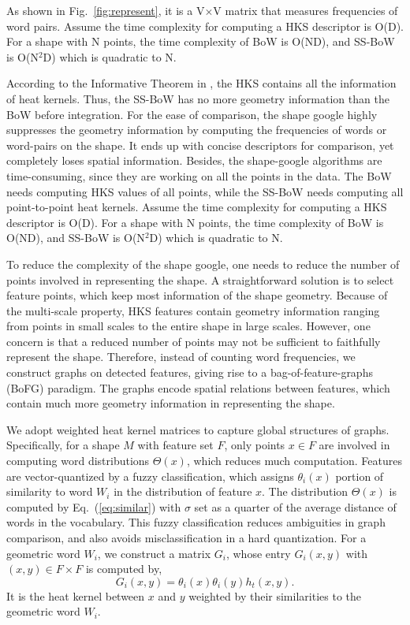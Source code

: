 As shown in Fig.~\ref{fig:represent}, it is a V$\times$V matrix that measures frequencies of word pairs. Assume the time complexity for computing a HKS descriptor is O(D). For a shape with N points, the time complexity of BoW is O(ND), and SS-BoW is O(N$^2$D) which is quadratic to N.

According to the Informative Theorem in \cite{Sun:2009:CGF}, the HKS contains all the information of heat kernels. Thus, the SS-BoW has no more geometry information than the BoW before integration. For the ease of comparison, the shape google highly suppresses the geometry information by computing the frequencies of words or word-pairs on the shape. It ends up with concise descriptors for comparison, yet completely loses spatial information. Besides, the shape-google algorithms are time-consuming, since they are working on all the points in the data. The BoW needs computing HKS values of all points, while the SS-BoW needs computing all point-to-point heat kernels. Assume the time complexity for computing a HKS descriptor is O(D). For a shape with N points, the time complexity of BoW is O(ND), and SS-BoW is O(N$^2$D) which is quadratic to N.

To reduce the complexity of the shape google, one needs to reduce the number of points involved in representing the shape. A straightforward solution is to select feature points, which keep most information of the shape geometry. Because of the multi-scale property, HKS features contain geometry information ranging from points in small scales to the entire shape in large scales. However, one concern is that a reduced number of points may not be sufficient to faithfully represent the shape. Therefore, instead of counting word frequencies, we construct graphs on detected features, giving rise to a bag-of-feature-graphs (BoFG) paradigm. The graphs encode spatial relations between features, which contain much more geometry information in representing the shape.

We adopt weighted heat kernel matrices to capture global structures of graphs. Specifically, for a shape $M$ with feature set $F$, only points $x\in F$ are involved in computing word distributions $\Theta(x)$, which reduces much computation. Features are vector-quantized by a fuzzy classification, which assigns $\theta_i(x)$ portion of similarity to word $W_i$ in the distribution of feature $x$. The distribution $\Theta(x)$ is computed by Eq.~(\ref{eq:similar}) with $\sigma$ set as a quarter of the average distance of words in the vocabulary. This fuzzy classification reduces ambiguities in graph comparison, and also avoids misclassification in a hard quantization. For a geometric word $W_i$, we construct a matrix $G_i$, whose entry $G_i(x,y)$ with $(x,y)\in F\times F$ is computed by,
\begin{equation}
G_i(x,y)=\theta_i(x)\theta_i(y)h_t(x,y).
\end{equation}
It is the heat kernel between $x$ and $y$ weighted by their similarities to the geometric word $W_i$.

